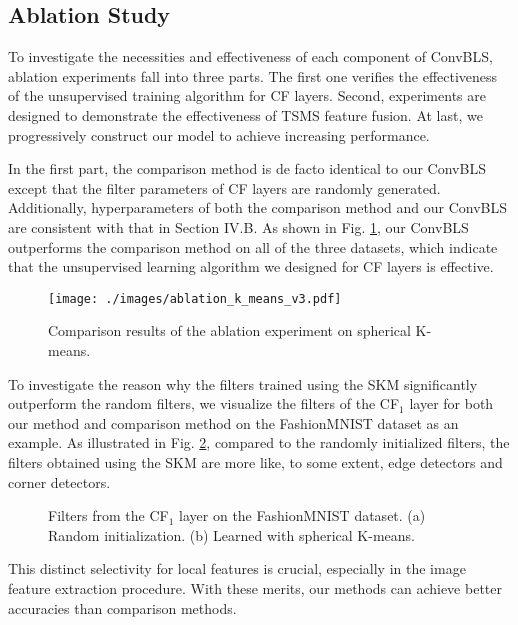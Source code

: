 \documentclass[lettersize,journal]{IEEEtran}
\begin{document}
\subsection{Ablation Study}
To investigate the necessities and effectiveness of each component of ConvBLS, ablation experiments fall into three parts. The first one verifies the effectiveness of the unsupervised training algorithm for CF layers. Second, experiments are designed to demonstrate the effectiveness of TSMS feature fusion. At last, we progressively construct our model to achieve increasing performance.

In the first part, the comparison method is de facto identical to our ConvBLS except that the filter parameters of CF layers are randomly generated. Additionally, hyperparameters of both the comparison method and our ConvBLS are consistent with that in Section IV.B. As shown in Fig. \ref{fig:ablation:kmeans}, our ConvBLS outperforms the comparison method on all of the three datasets, which indicate that the unsupervised learning algorithm we designed for CF layers is effective.
\begin{figure}[!t]
\centering
\texttt{[image: ./images/ablation\_k\_means\_v3.pdf]}
\caption{Comparison results of the ablation experiment on spherical K-means.}
\label{fig:ablation:kmeans}
\end{figure}
To investigate the reason why the filters trained using the SKM significantly outperform the random filters, we visualize the filters of the CF$_1$ layer for both our method and comparison method on the FashionMNIST dataset as an example. As illustrated in Fig. \ref{fig:filters}, compared to the randomly initialized filters, the filters obtained using the SKM are more like, to some extent, edge detectors and corner detectors.
\begin{figure}[!t]
    \centering
    \hfil
    \caption{Filters from the CF$_1$ layer on the FashionMNIST dataset. (a) Random initialization. (b) Learned with spherical K-means.}
    \label{fig:filters}
\end{figure}
This distinct selectivity for local features is crucial, especially in the image feature extraction procedure. With these merits, our methods can achieve better accuracies than comparison methods.
\end{document}
